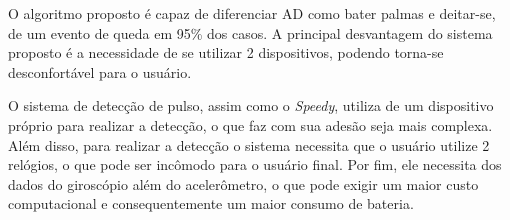 O algoritmo proposto é capaz de diferenciar \ac{AD} como bater palmas e deitar-se, de um evento de queda em 95\% dos casos. A principal desvantagem do sistema proposto é a necessidade de se utilizar 2 dispositivos, podendo torna-se desconfortável para o usuário.

O sistema de detecção de pulso, assim como o \textit{Speedy}, utiliza de um dispositivo próprio para realizar a detecção, o que faz com sua adesão seja mais complexa. Além disso, para realizar a detecção o sistema necessita que o usuário utilize 2 relógios, o que pode ser incômodo para o usuário final. Por fim, ele necessita dos dados do giroscópio além do acelerômetro, o que pode exigir um maior custo computacional e consequentemente um maior consumo de bateria. 








